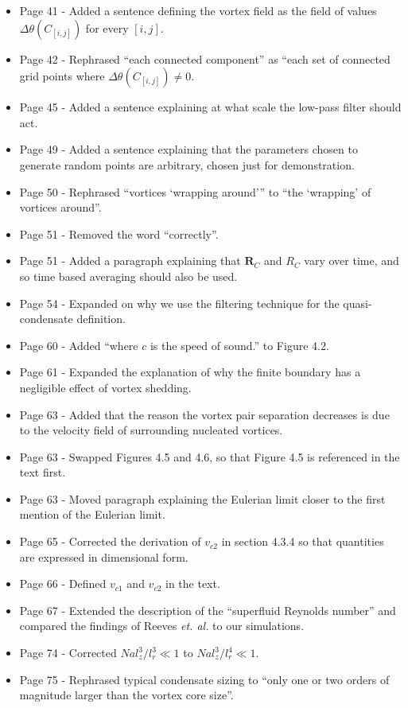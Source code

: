 \documentclass{article}
\begin{document}
\begin{itemize}
\item Page 41 - Added a sentence defining the vortex field as the field of values $\Delta\theta(C_{[i,j]})$ for every $[i,j]$.
\item Page 42 - Rephrased ``each connected component'' as ``each set of connected grid points where $\Delta\theta(C_{[i,j]})\neq 0$.
\item Page 45 - Added a sentence explaining at what scale the low-pass filter should act.
\item Page 49 - Added a sentence explaining that the parameters chosen to generate random points are arbitrary, chosen just for demonstration.
\item Page 50 - Rephrased ``vortices `wrapping around''' to ``the `wrapping' of vortices around''.
\item Page 51 - Removed the word ``correctly''.
\item Page 51 - Added a paragraph explaining that $\mathbf{R}_C$ and $R_C$ vary over time, and so time based averaging should also be used.
\item Page 54 - Expanded on why we use the filtering technique for the quasi-condensate definition.
\item Page 60 - Added ``where $c$ is the speed of sound.'' to Figure 4.2.
\item Page 61 - Expanded the explanation of why the finite boundary has a negligible effect of vortex shedding.
\item Page 63 - Added that the reason the vortex pair separation decreases is due to the velocity field of surrounding nucleated vortices.
\item Page 63 - Swapped Figures 4.5 and 4.6, so that Figure 4.5 is referenced in the text first.
\item Page 63 - Moved paragraph explaining the Eulerian limit closer to the first mention of the Eulerian limit.
\item Page 65 - Corrected the derivation of $v_{c2}$ in section 4.3.4 so that quantities are expressed in dimensional form.
\item Page 66 - Defined $v_{c1}$ and $v_{c2}$ in the text.
\item Page 67 - Extended the description of the ``superfluid Reynolds number'' and compared the findings of Reeves {\it et. al.} to our simulations.
\item Page 74 - Corrected $N a l_z^3/l_r^3 \ll 1$ to $N a l_z^3/l_r^4 \ll 1$.
\item Page 75 - Rephrased typical condensate sizing to ``only one or two orders of magnitude larger than the vortex core size''.

\end{itemize}
\end{document}
